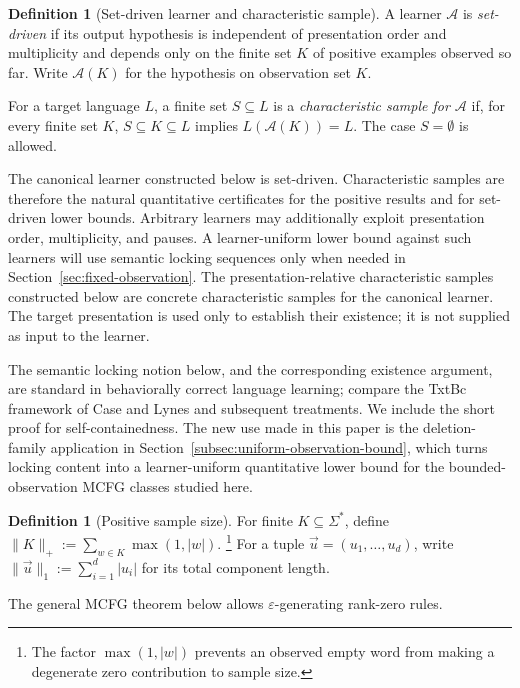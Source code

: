 \documentclass[11pt,a4paper]{article}
\numberwithin{equation}{section}
\theoremstyle{plain}
\theoremstyle{definition}
\newtheorem{definition}[theorem]{Definition}
\theoremstyle{remark}
\newcommand{\tuple}[1]{\vec{#1}}
\newcommand{\eps}{\varepsilon}
\begin{document}
\begin{definition}[Set-driven learner and characteristic sample]
A learner \(\mathcal A\) is \emph{set-driven} if its output hypothesis is
independent of presentation order and multiplicity and depends only on the
finite set \(K\) of positive examples observed so far.  Write
\(\mathcal A(K)\) for the hypothesis on observation set \(K\).

For a target language \(L\), a finite set \(S\subseteq L\) is a
\emph{characteristic sample for \(\mathcal A\)} if, for every finite set
\(K\), \(S\subseteq K\subseteq L\) implies \(L(\mathcal A(K))=L\).
The case \(S=\emptyset\) is allowed.

The canonical learner constructed below is set-driven.  Characteristic samples
are therefore the natural quantitative certificates for the positive results
and for set-driven lower bounds.  Arbitrary learners may additionally exploit presentation order, multiplicity,
and pauses.  A learner-uniform lower bound against such learners will use
semantic locking sequences only when needed in Section~\ref{sec:fixed-observation}.
The presentation-relative characteristic samples constructed below are
concrete characteristic samples for the canonical learner.  The target
presentation is used only to establish their existence; it is not supplied as
input to the learner.
\end{definition}

The semantic locking notion below, and the corresponding existence argument,
are standard in behaviorally correct language learning; compare the TxtBc
framework of Case and Lynes \cite{CaseLynes1982} and subsequent treatments.
We include the short proof for self-containedness.  The new use made in this
paper is the deletion-family application in
Section~\ref{subsec:uniform-observation-bound}, which turns locking content
into a learner-uniform quantitative lower bound for the bounded-observation
MCFG classes studied here.

\begin{definition}[Positive sample size]
For finite \(K\subseteq\Sigma^*\), define
\(\|K\|_+:=\sum_{w\in K}\max(1,|w|)\).%
\footnote{The factor \(\max(1,|w|)\) prevents an observed empty word from
making a degenerate zero contribution to sample size.}
For a tuple \(\tuple u=(u_1,\ldots,u_d)\), write
\(\|\tuple u\|_1:=\sum_{i=1}^d |u_i|\)
for its total component length.
\end{definition}

The general MCFG theorem below allows \(\eps\)-generating rank-zero rules.
\end{document}
